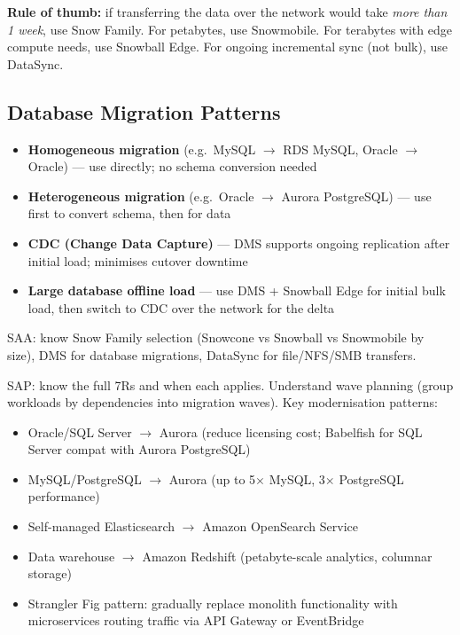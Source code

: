 \begin{examtip}
\textbf{Rule of thumb:} if transferring the data over the network would take \emph{more than 1 week}, use Snow Family. For petabytes, use Snowmobile. For terabytes with edge compute needs, use Snowball Edge. For ongoing incremental sync (not bulk), use DataSync.
\end{examtip}

\subsection{Database Migration Patterns}

\begin{keyfacts}
\begin{itemize}
  \item \textbf{Homogeneous migration} (e.g.\ MySQL $\to$ RDS MySQL, Oracle $\to$ Oracle) --- use  directly; no schema conversion needed
  \item \textbf{Heterogeneous migration} (e.g.\ Oracle $\to$ Aurora PostgreSQL) --- use  first to convert schema, then  for data
  \item \textbf{CDC (Change Data Capture)} --- DMS supports ongoing replication after initial load; minimises cutover downtime
  \item \textbf{Large database offline load} --- use DMS + Snowball Edge for initial bulk load, then switch to CDC over the network for the delta
\end{itemize}
\end{keyfacts}

\begin{saadepth}
SAA: know Snow Family selection (Snowcone vs Snowball vs Snowmobile by size), DMS for database migrations, DataSync for file/NFS/SMB transfers.
\end{saadepth}

\begin{sapdepth}
SAP: know the full 7Rs and when each applies. Understand wave planning (group workloads by dependencies into migration waves). Key modernisation patterns:
\begin{itemize}
  \item Oracle/SQL Server $\to$ Aurora (reduce licensing cost; Babelfish for SQL Server compat with Aurora PostgreSQL)
  \item MySQL/PostgreSQL $\to$ Aurora (up to 5$\times$ MySQL, 3$\times$ PostgreSQL performance)
  \item Self-managed Elasticsearch $\to$ Amazon OpenSearch Service
  \item Data warehouse $\to$ Amazon Redshift (petabyte-scale analytics, columnar storage)
  \item Strangler Fig pattern: gradually replace monolith functionality with microservices routing traffic via API Gateway or EventBridge
\end{itemize}
\end{sapdepth}
